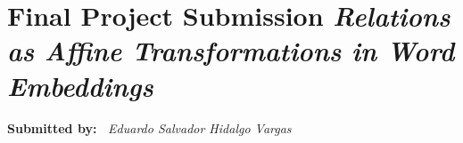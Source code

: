 \documentclass[paragraphspacing, palatinofont]{nsfprop}
\begin{document}

\section*{Final Project Submission \textit{Relations as Affine Transformations in Word Embeddings}}

\textbf{Submitted by:~} \textit{Eduardo Salvador Hidalgo Vargas}


% 
% 
% 
% 
% 
% 
% 
% 
% 



%


%
\end{document}

